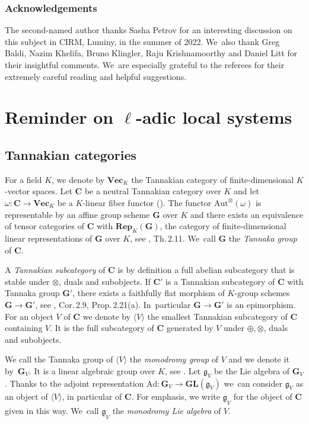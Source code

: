 \documentclass[JEP,XML,SOM,Unicode,published]{cedram}
\numberwithin{equation}{subsection}
\theoremstyle{definition}
\begin{document}
\subsubsection*{Acknowledgements}
The second-named author thanks Sasha Petrov for an interesting discussion on this subject in CIRM, Luminy, in the summer of 2022. We~also thank Greg Baldi, Nazim Khelifa, Bruno Klingler, Raju Krishnamoorthy and Daniel Litt for their insightful comments. We~are especially grateful to the referees for their extremely careful reading and helpful suggestions.

\section{Reminder on \texorpdfstring{$\ell$}{l}-adic local systems}\label{sec: coefficient}

\subsection{Tannakian categories}
For a field $K$, we denote by $\mathbf{Vec}_K$ the Tannakian category of finite-dimensional $K$-vector spaces. Let $\mathbf{C}$ be a neutral Tannakian category over $K$ and let $\omega\colon\mathbf{C}\to\mathbf{Vec}_K$ be a $K$-linear fiber functor (\cite[Def.\,2.19]{Deligne-Milne-Tannakian-Categories}). The functor $\mathrm{Aut}^\otimes(\omega)$ is representable by an affine group scheme $\mathbf{G}$ over $K$ and there exists an equivalence of tensor categories of $\mathbf{C}$ with $\mathbf{Rep}_K(\mathbf{G})$, the category of finite-dimensional linear representations of $\mathbf{G}$ over $K$, see \loccit, Th.\,2.11. We~call $\mathbf{G}$ the \emph{Tannaka group} of $\mathbf{C}$.

A \emph{Tannakian subcategory} of $\mathbf{C}$ is by definition a full abelian subcategory that is stable under $\otimes$, duals and subobjects. If $\mathbf{C}'$ is a Tannakian subcategory of $\mathbf{C}$ with Tannaka group $\mathbf{G}'$, there exists a faithfully flat morphism of $K$-group schemes $\mathbf{G}\to\mathbf{G}'$, see \loccit, Cor.\,2.9, Prop.\,2.21(a). In~particular $\mathbf{G}\to\mathbf{G}'$ is an epimorphism. For an object $V$ of $\mathbf{C}$ we denote by $\langle V\rangle$ the smallest Tannakian subcategory of $\mathbf{C}$ containing $V$. It is the full subcategory of $\mathbf{C}$ generated by $V$ under $\oplus, \otimes$, duals and subobjects.

We call the Tannaka group of $\langle V\rangle$ the \emph{monodromy group} of $V$ and we denote it by~$\mathbf{G}_V$. It is a linear algebraic group over $K$, see \cite[Prop.\,2.20(b)]{Deligne-Milne-Tannakian-Categories}. Let $\mathfrak{g}_V$ be the Lie algebra of $\mathbf{G}_V$. Thanks to the adjoint representation $\mathrm{Ad}\colon\mathbf{G}_V\to\mathbf{GL}(\mathfrak{g}_V)$ we~can consider $\mathfrak{g}_V$ as an object of $\langle V\rangle$, in particular of $\mathbf{C}$. For emphasis, we write $\underline{\mathfrak{g}}_V$ for the object of $\mathbf{C}$ given in this way. We~call $\underline{\mathfrak{g}}_V$ the \emph{monodromy Lie algebra} of $V$.
\end{document}
